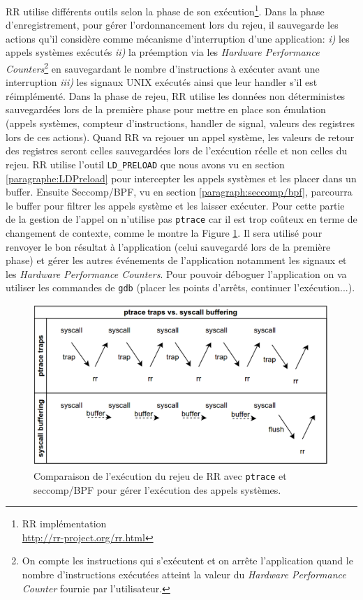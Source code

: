 RR utilise différents outils selon la phase de son exécution\footnote{RR
  implémentation \\ \url{http://rr-project.org/rr.html}}. Dans la phase
d'enregistrement, pour gérer l'ordonnancement lors du rejeu, il sauvegarde les
actions qu'il considère comme mécanisme d'interruption d'une application:
\textit{i)} les appels systèmes exécutés \textit{ii)} la préemption via les
\textit{Hardware Performance Counters}\footnote{On compte les instructions qui
  s'exécutent et on arrête l'application quand le nombre d'instructions exécutées
  atteint la valeur du \textit{Hardware Performance Counter} fournie par
  l'utilisateur.} en sauvegardant le nombre d'instructions à exécuter avant une
interruption \textit{iii)} les signaux UNIX exécutés ainsi que leur handler s'il
est réimplémenté. Dans la phase de rejeu, RR utilise les données non
déterministes sauvegardées lors de la première phase pour mettre en place son
émulation (appels systèmes, compteur d'instructions, handler de signal, valeurs
des registres lors de ces actions). Quand RR va rejouer un appel système, les
valeurs de retour des registres seront celles sauvegardées lors de l'exécution
réelle et non celles du rejeu. RR utilise l'outil \texttt{LD\_PRELOAD} que nous
avons vu en section \ref{paragraphe:LDPreload} pour intercepter les appels
systèmes et les placer dans un buffer. Ensuite Seccomp/BPF, vu en section
\ref{paragraph:seccomp/bpf}, parcourra le buffer pour filtrer les appels système
et les laisser exécuter. Pour cette partie de la gestion de l'appel on n'utilise
pas \texttt{ptrace} car il est trop coûteux en terme de changement de contexte,
comme le montre la Figure \ref{AS_RR}. Il sera utilisé pour renvoyer le bon
résultat à l'application (celui sauvegardé lors de la première phase) et gérer
les autres événements de l'application notamment les signaux et les
\textit{Hardware Performance Counters}. Pour pouvoir déboguer l'application on
va utiliser les commandes de \texttt{gdb} (placer les points d'arrêts, continuer
l'exécution...).

\begin{figure}
\centering \includegraphics[scale=0.30]{Pictures/png/RR_AS}
\caption[Comparaison de l'exécution du rejeu de RR]{Comparaison de l'exécution du rejeu de RR avec \texttt{ptrace} et seccomp/BPF
  pour gérer l'exécution des appels systèmes.}
\label{AS_RR}
\end{figure}

